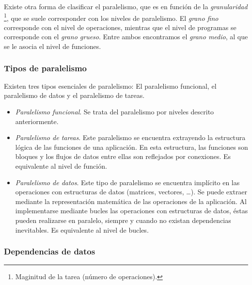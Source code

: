 \documentclass[11pt,twoside,titlepage,a4paper]{article}
\begin{document}
Existe otra forma de clasificar el paralelismo, que es en función de la \textit{granularidad}
\footnote{Maginitud de la tarea (número de operaciones).}, que se suele corresponder con los niveles de
paralelismo. El \textit{grano fino} corresponde con el nivel de operaciones, mientras que el nivel de
programas se corresponde con el \textit{grano grueso}. Entre ambos encontramos el \textit{grano medio}, al
que se le asocia el nivel de funciones.

\subsubsection*{Tipos de paralelismo}

Existen tres tipos esenciales de paralelismo: El paralelismo funcional, el paralelismo de datos y el
paralelismo de tareas.
\begin{itemize}[noitemsep]
	\item \textit{Paralelismo funcional}. Se trata del paralelismo por niveles descrito anteriormente.
	\item \textit{Paralelismo de tareas}. Este paralelismo se encuentra extrayendo la estructura lógica de
	las funciones de una aplicación. En esta estructura, las funciones son bloques y los flujos de datos
	entre ellas son reflejados por conexiones. Es equivalente al nivel de función.
	\item \textit{Paralelismo de datos}. Este tipo de paralelismo se encuentra implícito en las operaciones
	con estructuras de datos (matrices, vectores, \dots). Se puede extraer mediante la representación
	matemática de las operaciones de la aplicación. Al implementarse mediante bucles las operaciones con
	estructuras de datos, éstas pueden realizarse en paralelo, siempre y cuando no existan dependencias
	inevitables. Es equivalente al nivel de bucles.
\end{itemize}

\subsubsection*{Dependencias de datos}
\end{document}
